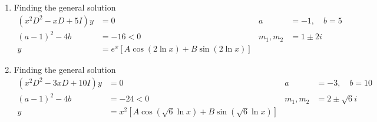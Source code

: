 \begin{enumerate}
    \item Finding the general solution
          \begin{align}
              (x^{2}D^{2} - xD + 5I)y & = 0                                      &
              a                       & = -1, \quad b= 5                           \\
              (a-1)^{2}-4b            & = -16 < 0                                &
              m_{1}, m_{2}            & =  1 \pm 2i                                \\
              y                       & = e^{x}[A\cos(2 \ln x) + B\sin(2 \ln x)]
          \end{align}

    \item Finding the general solution
          \begin{align}
              (x^{2}D^{2} - 3xD + 10I)y & = 0                             &
              a                         & = -3, \quad b= 10                 \\
              (a-1)^{2}-4b              & = -24 < 0                       &
              m_{1}, m_{2}              & =  2 \pm \sqrt{6}i                \\
              y                         & = x^{2} [A\cos(\sqrt{6}\ln x) +
                      B\sin(\sqrt{6}\ln x)]
          \end{align}


\end{enumerate}
